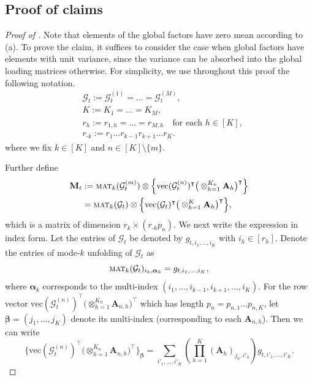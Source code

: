 \documentclass[aos]{imsart}
\theoremstyle{plain}
\theoremstyle{definition}
\def\mat{\textnormal{\textsc{mat}}}
\def\cG{\mathcal{G}} \def\cH{\boldsymbol{\mathcal{H}}} \def\cI{\mathcal{I}}
\def\bA{\mathbf{A}}
\def\bM{\mathbf{M}}
\def\balpha{\boldsymbol{\alpha}}
\def\bbeta{\boldsymbol{\beta}}
\def\trans{\intercal}
\def\vec{\mathrm{vec}}
\begin{document}
\subsection{Proof of claims}

\begin{proof}[Proof of ]
Note that elements of the global factors have zero mean according to (a). To prove the claim, it suffices to consider the case when global factors have elements with unit variance, since the variance can be absorbed into the global loading matrices otherwise. For simplicity, we use throughout this proof the following notation.
\begin{align*}
    & \cG_t := \cG_t^{(1)} =\dots =\cG_t^{(M)}, \\
    & K:= K_1=\dots =K_M, \\
    & r_{h} := r_{1,h}=\dots =r_{M,h} \quad \text{for each $h\in[K]$} , \\
    & r_{\text{-}k} := r_1 \dots r_{k-1} r_{k+1} \dots r_K .
\end{align*}
where we fix $k\in[K]$ and $n\in[K] \setminus\{m\}$.

Further define
\begin{align*}
    \bM_t &:= \mat_k(\cG_t^{(m)}) \otimes \Big\{ \vec(\cG_t^{(n)})^\trans \big( \otimes_{h=1}^{K_n} \bA_{h} \big)^\trans \Big\} \\
    &=
    \mat_k(\cG_t) \otimes \Big\{ \vec(\cG_t)^\trans \big( \otimes_{h=1}^{K} \bA_{h} \big)^\trans \Big\} ,
\end{align*}
which is a matrix of dimension $r_k \times (r_{\text{-}k} p_n)$. We next write the expression in index form.
Let the entries of $\cG_t$ be denoted by $g_{t,i_1, \dots, i_K}$ with $i_h \in [r_h]$.
Denote the entries of mode-$k$ unfolding of $\cG_t$ as
\[
\mat_k(\cG_t)_{i_k, \balpha_k} = g_{t,i_1, \dots, i_K},
\]
where $\balpha_k$ corresponds to the multi-index $(i_1, \dots, i_{k-1}, i_{k+1}, \dots, i_K)$. For the row vector $\vec(\cG_t^{(n)})^\trans \big( \otimes_{h=1}^{K_n} \bA_{n,h} \big)^\trans$ which has length $p_n=p_{n,1}\dots p_{n,K}$, let $\bbeta = (j_1, \dots, j_K)$ denote its multi-index (corresponding to each $\bA_{n,h}$). Then we can write
\[
\Big\{ \vec(\cG_t^{(n)})^\trans \big( \otimes_{h=1}^{K_n} \bA_{n,h} \big)^\trans \Big\}_{\bbeta} = \sum_{i'_1, \dots, i'_K} \left( \prod_{h=1}^K (\bA_h)_{j_h, i'_h} \right) g_{t,i'_1, \dots, i'_K}.
\]


\end{proof}
\end{document}
